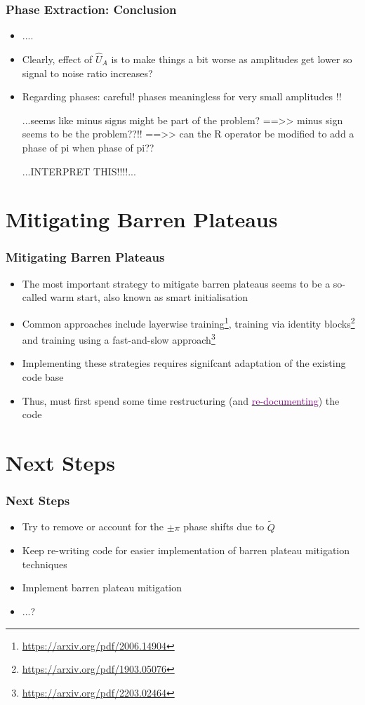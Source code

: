 \documentclass{beamer}
\begin{document}
\begin{frame}
\frametitle{Phase Extraction: Conclusion}
\begin{itemize}
\item .... 
\item Clearly, effect of $\hat{U}_A$ is to make things a bit worse as amplitudes get lower so signal to noise ratio increases? 
\item Regarding phases: careful! phases meaningless for very small amplitudes !!


...seems like minus signs might be part of the problem?
==>> minus sign seems to be the problem??!! 
==>> can the R operator be modified to add a phase of pi when phase of pi??

...INTERPRET THIS!!!!...

\end{itemize}
\end{frame}

\section{Mitigating Barren Plateaus}

\begin{frame}
\frametitle{Mitigating Barren Plateaus}
\begin{itemize}
\item The most important strategy to mitigate barren plateaus seems to be a so-called \alert{warm start}, also known as \alert{smart initialisation}
\item Common approaches include layerwise training\footnote{\url{https://arxiv.org/pdf/2006.14904}}, training via identity blocks\footnote{\url{https://arxiv.org/pdf/1903.05076}} and training using a fast-and-slow approach\footnote{\url{https://arxiv.org/pdf/2203.02464}}
\item Implementing these strategies requires signifcant adaptation of the existing code base 
\item Thus, must first \alert{spend some time restructuring} (and \href{http://localhost:8080/pqcprep.html}{\textcolor{purple}{re-documenting}}) the code  
\end{itemize}
\end{frame}



\section{Next Steps}

\begin{frame}
\frametitle{Next Steps}
\begin{itemize}
\item Try to remove or account for the $\pm \pi$ phase shifts due to $\tilde{Q}$
\item Keep re-writing code for easier implementation of barren plateau mitigation techniques
\item Implement barren plateau mitigation 
\item ...?
\end{itemize}
\end{frame}
\end{document}
